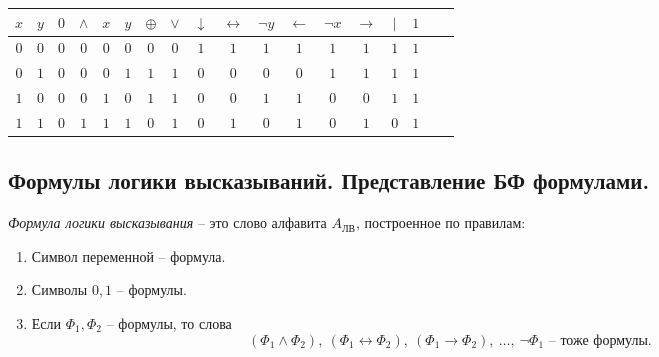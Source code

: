 \begin{note}
    \begin{center}
        \begin{tabular}{c c | c c c c c c c c c c c c c c c c}
            $x$ & $y$ & $0$ & $\land$ & $x$ & $y$ & $\oplus$ & $\lor$ & $\downarrow$ & $\leftrightarrow$ & $\lnot y$ & $\leftarrow$ & $\lnot x$ & $\rightarrow$ & $\vert$ & $1$ \\ [0.5ex]
            \hline
            $0$ & $0$ & $0$ & $0$     & $0$ & $0$ & $0$      & $0$    & $1$          & $1$               & $1$       & $1$          & $1$       & $1$           & $1$     & $1$ \\
            $0$ & $1$ & $0$ & $0$     & $0$ & $1$ & $1$      & $1$    & $0$          & $0$               & $0$       & $0$          & $1$       & $1$           & $1$     & $1$ \\
            $1$ & $0$ & $0$ & $0$     & $1$ & $0$ & $1$      & $1$    & $0$          & $0$               & $1$       & $1$          & $0$       & $0$           & $1$     & $1$ \\
            $1$ & $1$ & $0$ & $1$     & $1$ & $1$ & $0$      & $1$    & $0$          & $1$               & $0$       & $1$          & $0$       & $1$           & $0$     & $1$
        \end{tabular}
        \label{table:3}
    \end{center}
\end{note}

\subsection{Формулы логики высказываний. Представление БФ формулами.}

\begin{definition}
    \emph{Формула логики высказывания} -- это слово алфавита $A_{\text{ЛВ}}$, построенное по правилам:
    \begin{enumerate}
        \item Символ переменной -- формула.
        \item Символы $0,1$ -- формулы.
        \item Если $\Phi_1,\Phi_2$ -- формулы, то слова
              \[
                  (\Phi_1 \land \Phi_2), \ (\Phi_1 \leftrightarrow \Phi_2), \ (\Phi_1 \rightarrow \Phi_2), \ \ldots, \ \lnot\Phi_1\text{ -- тоже формулы.}
              \]
    \end{enumerate}
\end{definition}

